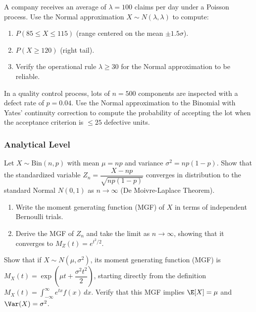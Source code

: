 \begin{problema}
	\label{prob:3.9.5}
	A company receives an average of $\lambda = 100$ claims per day under a Poisson process. Use the Normal approximation $X \sim N(\lambda, \lambda)$ to compute:
	\begin{enumerate}
		\item $P(85 \le X \le 115)$ (range centered on the mean $\pm 1.5\sigma$).
		\item $P(X \ge 120)$ (right tail).
		\item Verify the operational rule $\lambda \ge 30$ for the Normal approximation to be reliable.
	\end{enumerate}
\end{problema}

\begin{problema}
	\label{prob:3.9.6}
	In a quality control process, lots of $n = 500$ components are inspected with a defect rate of $p = 0.04$. Use the Normal approximation to the Binomial with Yates' continuity correction to compute the probability of accepting the lot when the acceptance criterion is $\le 25$ defective units.
\end{problema}

\subsubsection*{Analytical Level}

\begin{problema}
	\label{prob:3.9.7}
	Let $X \sim \text{Bin}(n, p)$ with mean $\mu = np$ and variance $\sigma^{2} = np(1-p)$. Show that the standardized variable $Z_{n} = \dfrac{X - np}{\sqrt{np(1-p)}}$ converges in distribution to the standard Normal $N(0, 1)$ as $n \to \infty$ (De Moivre-Laplace Theorem).
	\begin{enumerate}
		\item Write the moment generating function (MGF) of $X$ in terms of independent Bernoulli trials.
		\item Derive the MGF of $Z_{n}$ and take the limit as $n \to \infty$, showing that it converges to $M_{Z}(t) = e^{t^{2}/2}$.
	\end{enumerate}
\end{problema}

\begin{problema}
	\label{prob:3.9.8}
	Show that if $X \sim N(\mu, \sigma^{2})$, its moment generating function (MGF) is $M_{X}(t) = \exp\left(\mu t + \dfrac{\sigma^{2} t^{2}}{2}\right)$, starting directly from the definition $M_{X}(t) = \int_{-\infty}^{\infty} e^{tx} f(x)\,dx$. Verify that this MGF implies $\E[X] = \mu$ and $\Var(X) = \sigma^{2}$.
\end{problema}

